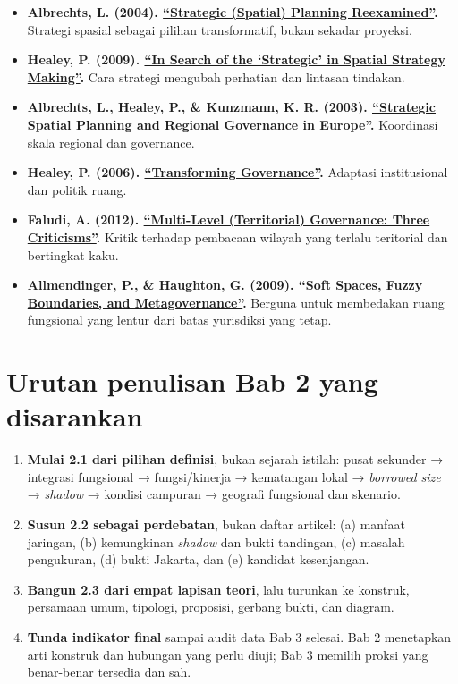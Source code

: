 \documentclass[
  indonesian,
  11pt,
  a4paper,
  oneside,
  openany]{report}
\providecommand{\tightlist}{%
  \setlength{\itemsep}{0pt}\setlength{\parskip}{0pt}}
\begin{document}
\begin{itemize}
\tightlist
\item
  \textbf{Albrechts, L. (2004).
  \href{https://doi.org/10.1068/b3065}{``Strategic (Spatial) Planning
  Reexamined''}.} Strategi spasial sebagai pilihan transformatif, bukan
  sekadar proyeksi.
\item
  \textbf{Healey, P. (2009).
  \href{https://doi.org/10.1080/14649350903417191}{``In Search of the
  `Strategic' in Spatial Strategy Making''}.} Cara strategi mengubah
  perhatian dan lintasan tindakan.
\item
  \textbf{Albrechts, L., Healey, P., \& Kunzmann, K. R. (2003).
  \href{https://doi.org/10.1080/01944360308976301}{``Strategic Spatial
  Planning and Regional Governance in Europe''}.} Koordinasi skala
  regional dan governance.
\item
  \textbf{Healey, P. (2006).
  \href{https://doi.org/10.1080/09654310500420792}{``Transforming
  Governance''}.} Adaptasi institusional dan politik ruang.
\item
  \textbf{Faludi, A. (2012).
  \href{https://doi.org/10.1080/14649357.2012.677578}{``Multi-Level
  (Territorial) Governance: Three Criticisms''}.} Kritik terhadap
  pembacaan wilayah yang terlalu teritorial dan bertingkat kaku.
\item
  \textbf{Allmendinger, P., \& Haughton, G. (2009).
  \href{https://doi.org/10.1068/a40208}{``Soft Spaces, Fuzzy Boundaries,
  and Metagovernance''}.} Berguna untuk membedakan ruang fungsional yang
  lentur dari batas yurisdiksi yang tetap.
\end{itemize}

\section{Urutan penulisan Bab 2 yang
disarankan}\label{urutan-penulisan-bab-2-yang-disarankan}

\begin{enumerate}
\def\labelenumi{\arabic{enumi}.}
\tightlist
\item
  \textbf{Mulai 2.1 dari pilihan definisi}, bukan sejarah istilah: pusat
  sekunder → integrasi fungsional → fungsi/kinerja → kematangan lokal →
  \emph{borrowed size} → \emph{shadow} → kondisi campuran → geografi
  fungsional dan skenario.
\item
  \textbf{Susun 2.2 sebagai perdebatan}, bukan daftar artikel: (a)
  manfaat jaringan, (b) kemungkinan \emph{shadow} dan bukti tandingan,
  (c) masalah pengukuran, (d) bukti Jakarta, dan (e) kandidat
  kesenjangan.
\item
  \textbf{Bangun 2.3 dari empat lapisan teori}, lalu turunkan ke
  konstruk, persamaan umum, tipologi, proposisi, gerbang bukti, dan
  diagram.
\item
  \textbf{Tunda indikator final} sampai audit data Bab 3 selesai. Bab 2
  menetapkan arti konstruk dan hubungan yang perlu diuji; Bab 3 memilih
  proksi yang benar-benar tersedia dan sah.
\end{enumerate}
\end{document}
